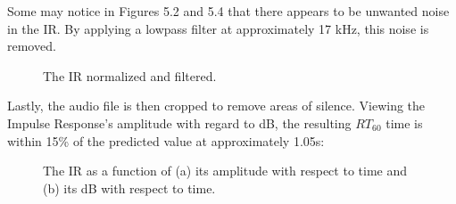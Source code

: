Some may notice in Figures 5.2 and 5.4 that there appears to be unwanted noise in the IR. By applying a lowpass filter at approximately 17 kHz, this noise is removed.

\begin{figure}[h] %
	\begin{center}
		\caption{The IR normalized and filtered.}
	\end{center}
\end{figure}
Lastly, the audio file is then cropped to remove areas of silence. Viewing the Impulse Response's amplitude with regard to dB, the resulting $RT_{60}$ time is within 15\% of the predicted value at approximately 1.05s:
\begin{figure}[h]
\begin{center}
 \hspace*{1.15cm}
\caption{The IR as a function of (a) its amplitude with respect to time and (b) its dB with respect to time.}
\end{center}
\end{figure}
